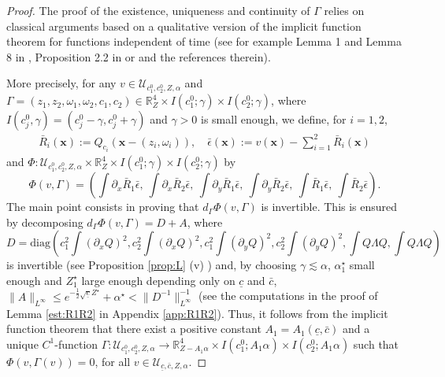 \documentclass[reqno,10pt]{amsart}
\numberwithin{equation}{section}
\newcommand{\bx}{\mathbf{x}}
\begin{document}
	\begin{proof}
		The proof of the existence, uniqueness and continuity of $\Gamma$ relies on classical arguments based on a qualitative version of the implicit function theorem for functions independent of time (see for example Lemma 1 and Lemma 8 in \cite{MMT02}, Proposition 2.2 in \cite{Eyc22} or \cite{PV23} and the references therein).
		
		More precisely, for any $v \in \mathcal{U}_{c_1^0, c_2^0, Z, \alpha}$ and $\Gamma=(z_1,z_2,\omega_1,\omega_2,c_1,c_2) \in \mathbb R^4_Z \times I(c_1^0;\gamma) \times I(c_2^0;\gamma)$, where $I(c_j^0,\gamma)=(c_j^0-\gamma,c_j^0+\gamma)$ and $\gamma>0$ is small enough, we define, for $i=1,2$,
		\begin{align*}
			\bar{R}_i(\bx):= Q_{c_i}(\bx-(z_i,\omega_i)), \quad \bar{\epsilon} (\bx) := v(\bx) - \sum_{i=1}^2 \bar{R}_i(\bx)
		\end{align*}
		and  $\Phi : \mathcal{U}_{c_1^0, c_2^0, Z, \alpha}  \times \mathbb R^4_Z \times I(c_1^0;\gamma) \times I(c_2^0;\gamma)$ by
		\begin{equation*}
			\Phi (v,\Gamma)  = \left( \int \partial_x \bar{R}_1 \bar{\epsilon}, \ \int \partial_x \bar{R}_2 \bar{\epsilon}, \ \int \partial_y \bar{R}_1 \bar{\epsilon}, \ \int \partial_y \bar{R}_2 \bar{\epsilon}, \ \int \bar{R}_1 \bar{\epsilon}, \ \int \bar{R}_2 \bar{\epsilon} \right) . 
		\end{equation*}
		The main point consists in proving  that $d_\Gamma \Phi(v,\Gamma)$ is invertible. 
		This is ensured by decomposing $d_\Gamma \Phi(v,\Gamma)=D+A$, where 
		\begin{equation*}
			D=\text{diag}\left(c_1^2\int (\partial_xQ)^2, c_2^2\int (\partial_xQ)^2, c_1^2\int (\partial_yQ)^2, c_2^2\int (\partial_yQ)^2,\int Q \Lambda Q,\int Q \Lambda Q  \right)
		\end{equation*}
		is invertible (see Proposition \ref{prop:L} (v) ) and, by choosing $\gamma \lesssim \alpha$, $\alpha_1^\star$
		small enough and $Z_1^\star$ large enough depending only on $\underline{c}$ and $\bar{c}$, $\|A\|_{L^{\infty}} \le e^{-\frac12 
			\sqrt{\underline{c}} Z^\star}+\alpha^{\star}<\|D^{-1}\|_{L^{\infty}}^{-1}$ (see the computations in the proof of Lemma \ref{est:R1R2} in Appendix \ref{app:R1R2}). Thus, it follows from the implicit function theorem that there exist a positive constant $A_1=A_1(\underline{c},\bar{c})$ and a unique $C^1$-function $\Gamma:\mathcal{U}_{c_1^0, c_2^0, Z, \alpha}  \to \mathbb R^4_{Z-A_1\alpha} \times I(c_1^0;A_1 \alpha) \times I(c_2^0;A_1 \alpha)$ such that $\Phi(v,\Gamma(v))=0$, for all $v \in \mathcal{U}_{\underline{c}, \bar{c}, Z, \alpha}$.
		

\end{proof}
\end{document}
